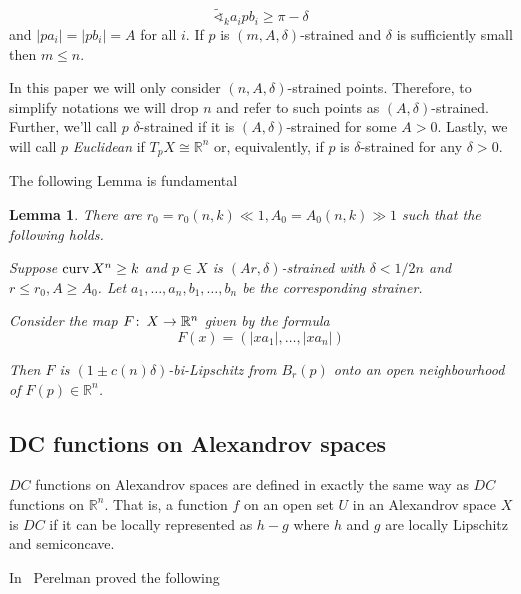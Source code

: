 \documentclass[12pt,leqno]{amsart}
\numberwithin{equation}{section}
\newtheorem{lem}[thm]{Lemma}
\theoremstyle{definition}
\theoremstyle{remark}
\newcommand{\R}{\mathbb{R}}
\def\co{\colon\thinspace}
\newcommand{\curv}{\mathop{\rm curv}}
\begin{document}
\[
\tilde\sphericalangle_ka_ipb_i\ge \pi-\delta
\]
and $|pa_i|=|pb_i|=A$ for all $i$. If $p$ is $(m,A,\delta)$-strained and $\delta$ is sufficiently small then $m\le n$.

In this paper we will only consider $(n,A,\delta)$-strained  points. Therefore, to simplify notations we will drop $n$ and refer to such points as $(A,\delta)$-strained. Further, we'll call $p$ $\delta$-strained if it is $(A,\delta)$-strained for some $A>0$. Lastly, we will call $p$ \emph{Euclidean} if $T_pX\cong \R^n$ or, equivalently, if $p$ is $\delta$-strained for any $\delta>0$.

The following Lemma is fundamental

\begin{lem}\label{lem-strainer-map}\cite{BGP}
There are $r_0=r_0(n,k)\ll 1, A_0=A_0(n,k)\gg 1$ such that the following holds.

Suppose $\curv X^n\ge k$ and  $p\in X$ is  $(Ar,\delta)$-strained with $\delta<1/2n$ and  $r\le r_0, A\ge A_0$. Let  $a_1,\ldots, a_n, b_1,\ldots, b_n$ be the corresponding strainer.

Consider the map $F\co X\to\R^n$ given by the formula
\[
F(x)=(|xa_1|,\ldots, |xa_n|)
\]

Then $F$ is $(1\pm c(n) \delta)$-bi-Lipschitz from $B_r(p)$ onto an open neighbourhood of $F(p)\in \R^n$.

\end{lem}










\subsection{DC functions on Alexandrov spaces}
$DC$ functions on Alexandrov spaces are defined in exactly the same way as $DC$ functions on $\R^n$. That is, a function $f$ on an open set $U$ in an Alexandrov space $X$ is $DC$ if  it can be locally represented as  $h-g$ where $h$ and $g$ are locally Lipschitz and semiconcave.

In~\cite{Per-DC} Perelman proved the following
\end{document}
